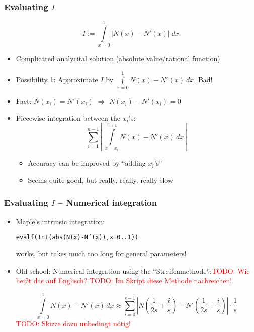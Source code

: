 \documentclass{beamer}
\newcommand{\todo}[1]{\textcolor{red}{TODO: #1}}
\begin{document}
\begin{frame}
  \frametitle{Evaluating $I$}
  \begin{equation*}
    I := \int\limits_{x=0}^1 | N(x) - N'(x) |\ dx
  \end{equation*}
  \begin{itemize}
  \item Complicated analycital solution (absolute value/rational function)
  \item Possibility 1: Approximate $I$ by $\int\limits_{x=0}^1 N(x) - N'(x) \  dx$. Bad!
  \item Fact: $N(x_i) = N'(x_i)$ 
    $\Rightarrow$ $N(x_i) - N'(x_i) = 0$
  \item Piecewise integration between the $x_i$'s:
    \begin{equation*}
      \sum\limits_{i=1}^{n-1} \left|\ \int\limits_{x=x_i}^{x_{i+1}} N(x) - N'(x) \  dx\ \right|
    \end{equation*}
    \begin{itemize}
    \item Accuracy can be improved by ``adding $x_i$'s''
    \item Seems quite good, but really, really, really slow
    \end{itemize}
  \end{itemize}
\end{frame}

\begin{frame}
  \frametitle{Evaluating $I$ -- Numerical integration}
  \begin{itemize}
  \item Maple's intrinsic integration:  
    \begin{center}
      \texttt{evalf(Int(abs(N(x)-N'(x)),x=0..1))}
    \end{center}
    works, but takes much too long for general parameters!
  \item Old-school: Numerical integration using the ``Streifenmethode'':\todo{Wie heißt das auf Englisch?} \todo{Im Skript diese Methode nachreichen!}
    
    \begin{equation*}
      \int\limits_{x=0}^1 N(x)-N'(x)\,dx \approx \sum_{i=0}^{s-1} \left| N\left(\frac{1}{2s} + \frac{i}{s}\right) - N'\left(\frac{1}{2s} + \frac{i}{s}\right) \right| \cdot \frac{1}{s}
    \end{equation*}
    \todo{Skizze dazu unbedingt nötig!}
  \end{itemize}
\end{frame}
\end{document}
